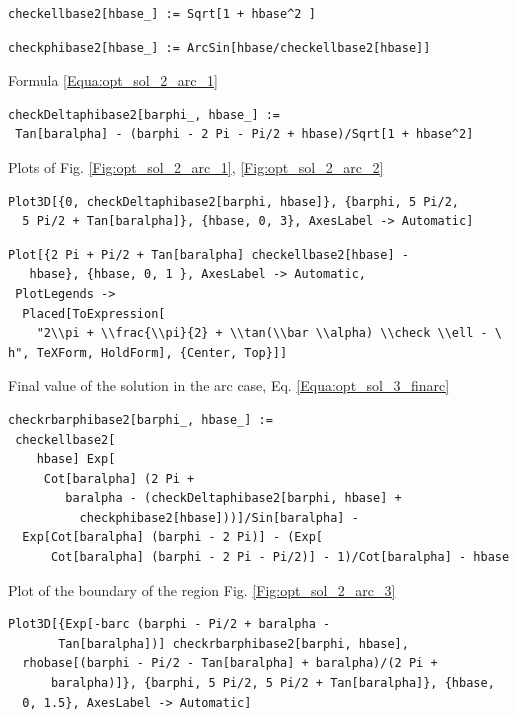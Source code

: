 \documentclass[reqno]{amsart}
\theoremstyle{definition} \newtheorem{definition}{Definition}[section]
\theoremstyle{definition} \newtheorem{remark}[definition]{Remark}
\theoremstyle{plain} \newtheorem{lemma}[definition]{Lemma}
\theoremstyle{plain} \newtheorem{proposition}[definition]{Proposition}
\theoremstyle{plain} \newtheorem{theorem}[definition]{Theorem}
\theoremstyle{plain} \newtheorem{corollary}[definition]{Corollary}
\theoremstyle{definition} \newtheorem{example}[definition]{Example}
\theoremstyle{plain} \newtheorem{claim}[clai]{Claim}
\theoremstyle{definition} \newtheorem{assumption}[definition]{Assumption}
\theoremstyle{definition} \newtheorem{observation}[definition]{Observation}
\newcommand{\1}{\mathbbm 1}
\newcommand{\smed}{\medskip}
\newcommand{\sbig}{\bigskip}
\numberwithin{equation}{section} %
\theoremstyle{plain} \newtheorem*{theorem*}{Theorem}
\theoremstyle{plain} \newtheorem{mthm}[maintheorem]{Main Theorem}
\theoremstyle{plain} \newtheorem*{mthm*}{Main Theorem}
\theoremstyle{plain} \newtheorem*{conjecture*}{Conjecture}
\theoremstyle{plain} \newtheorem{conjecture}[definition]{Conjecture}
\theoremstyle{plain} \newtheorem*{problem*}{Problem}
\begin{document}
\sbig


\sbig

\begin{verbatim}
checkellbase2[hbase_] := Sqrt[1 + hbase^2 ]
\end{verbatim}
\begin{verbatim}
checkphibase2[hbase_] := ArcSin[hbase/checkellbase2[hbase]]
\end{verbatim}
\smed
Formula \eqref{Equa:opt_sol_2_arc_1}
\smed
\begin{verbatim}
checkDeltaphibase2[barphi_, hbase_] := 
 Tan[baralpha] - (barphi - 2 Pi - Pi/2 + hbase)/Sqrt[1 + hbase^2]
\end{verbatim}
\smed
Plots of Fig. \ref{Fig:opt_sol_2_arc_1}, \ref{Fig:opt_sol_2_arc_2}
\smed
\begin{verbatim}
Plot3D[{0, checkDeltaphibase2[barphi, hbase]}, {barphi, 5 Pi/2, 
  5 Pi/2 + Tan[baralpha]}, {hbase, 0, 3}, AxesLabel -> Automatic]
\end{verbatim}
\begin{verbatim}
Plot[{2 Pi + Pi/2 + Tan[baralpha] checkellbase2[hbase] - 
   hbase}, {hbase, 0, 1 }, AxesLabel -> Automatic, 
 PlotLegends -> 
  Placed[ToExpression[
    "2\\pi + \\frac{\\pi}{2} + \\tan(\\bar \\alpha) \\check \\ell - \
h", TeXForm, HoldForm], {Center, Top}]]
\end{verbatim}
\smed
Final value of the solution in the arc case, Eq. \eqref{Equa:opt_sol_3_finarc}
\smed
\begin{verbatim}
checkrbarphibase2[barphi_, hbase_] := 
 checkellbase2[
    hbase] Exp[
     Cot[baralpha] (2 Pi + 
        baralpha - (checkDeltaphibase2[barphi, hbase] + 
          checkphibase2[hbase]))]/Sin[baralpha] - 
  Exp[Cot[baralpha] (barphi - 2 Pi)] - (Exp[
      Cot[baralpha] (barphi - 2 Pi - Pi/2)] - 1)/Cot[baralpha] - hbase
\end{verbatim}
\smed
Plot of the boundary of the region Fig. \ref{Fig:opt_sol_2_arc_3}
\smed
\begin{verbatim}
Plot3D[{Exp[-barc (barphi - Pi/2 + baralpha - 
       Tan[baralpha])] checkrbarphibase2[barphi, hbase], 
  rhobase[(barphi - Pi/2 - Tan[baralpha] + baralpha)/(2 Pi + 
      baralpha)]}, {barphi, 5 Pi/2, 5 Pi/2 + Tan[baralpha]}, {hbase, 
  0, 1.5}, AxesLabel -> Automatic]
\end{verbatim}
\end{document}

